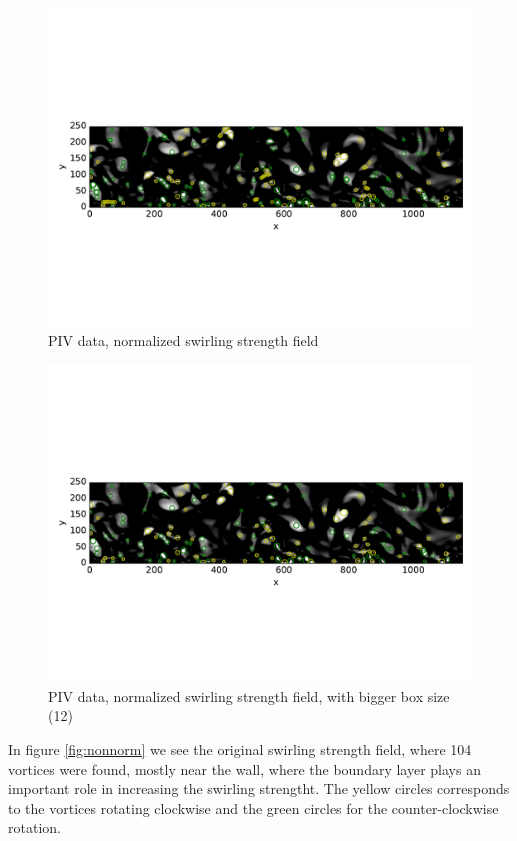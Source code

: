 \documentclass[12pt, a4paper, openany]{memoir}
\begin{document}
\begin{figure}[h]
	\centering
	\includegraphics[trim=0 130 0 130 , clip, width=\textwidth]{figure/PIVnormalized.pdf}
	\caption{PIV data, normalized swirling strength field}
	\label{fig:norm}
\end{figure}

\begin{figure}[h]
	\centering
	\includegraphics[trim=0 130 0 130 , clip, width=\textwidth]{figure/PIVbox12normalized.pdf}
	\caption{PIV data, normalized swirling strength field, with bigger box size (12)}
	\label{fig:boxnorm}
\end{figure}

In figure \ref{fig:nonnorm} we see the original swirling strength field, where 104 vortices were found, mostly near the wall, where the boundary layer plays an important role in increasing the swirling strengtht. The yellow circles corresponds to the vortices rotating clockwise and the green circles for the counter-clockwise rotation. 
\end{document}
